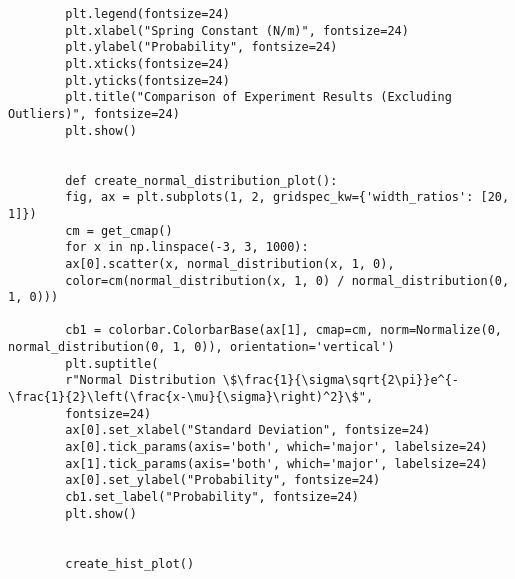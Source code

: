 \documentclass{article}
\begin{document}
\begin{verbatim}
        plt.legend(fontsize=24)
        plt.xlabel("Spring Constant (N/m)", fontsize=24)
        plt.ylabel("Probability", fontsize=24)
        plt.xticks(fontsize=24)
        plt.yticks(fontsize=24)
        plt.title("Comparison of Experiment Results (Excluding Outliers)", fontsize=24)
        plt.show()


        def create_normal_distribution_plot():
        fig, ax = plt.subplots(1, 2, gridspec_kw={'width_ratios': [20, 1]})
        cm = get_cmap()
        for x in np.linspace(-3, 3, 1000):
        ax[0].scatter(x, normal_distribution(x, 1, 0),
        color=cm(normal_distribution(x, 1, 0) / normal_distribution(0, 1, 0)))

        cb1 = colorbar.ColorbarBase(ax[1], cmap=cm, norm=Normalize(0, normal_distribution(0, 1, 0)), orientation='vertical')
        plt.suptitle(
        r"Normal Distribution \$\frac{1}{\sigma\sqrt{2\pi}}e^{-\frac{1}{2}\left(\frac{x-\mu}{\sigma}\right)^2}\$",
        fontsize=24)
        ax[0].set_xlabel("Standard Deviation", fontsize=24)
        ax[0].tick_params(axis='both', which='major', labelsize=24)
        ax[1].tick_params(axis='both', which='major', labelsize=24)
        ax[0].set_ylabel("Probability", fontsize=24)
        cb1.set_label("Probability", fontsize=24)
        plt.show()


        create_hist_plot()

    \end{verbatim}
\end{document}
